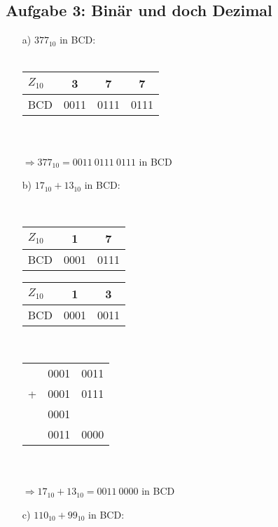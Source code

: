 \documentclass{article}
\begin{document}
    \subsection*{Aufgabe 3: Binär und doch Dezimal}
    \begin{enumerate}
        \item[a)]$377_{10}$ in BCD:\\\\
        \begin{tabular}{l|ccc} 
            $Z_{10}$ & 3    & 7    & 7 \\
            \hline
            BCD  & 0011 & 0111 & 0111
        \end{tabular}\\\\
        $\Rightarrow 377_{10} = 0011\: 0111\: 0111$ in BCD
        \item[b)]$17_{10}+13_{10}$ in BCD:\\
        \begin{minipage}[t]{0.3\textwidth}
        	\hfill \\
        	\begin{tabular}{l|cc}
        		$Z_{10}$ &  1   &  7   \\ \hline
        		BCD      & 0001 & 0111
        	\end{tabular}
        	\begin{tabular}{l|cc}
        		$Z_{10}$ &  1   &  3   \\ \hline
        		BCD      & 0001 & 0011
        	\end{tabular}
        \end{minipage}
    	\begin{minipage}[t]{0.2\textwidth}
    		\hfill \\
    		\begin{tabular}{crr}
    			  &             0001 & 0011 \\
    			+ &             0001 & 0111 \\
    			  & \color{gray}0001 &      \\ \hline
    			  &             0011 & 0000
    		\end{tabular}
    	\end{minipage}\\\\
        $\Rightarrow 17_{10} +13_{10}=0011\:0000$ in BCD
        \item[c)]$110_{10}+99_{10}$ in BCD:\\
        \begin{minipage}[t]{0.3\textwidth}

\end{minipage}
\end{enumerate}
\end{document}
